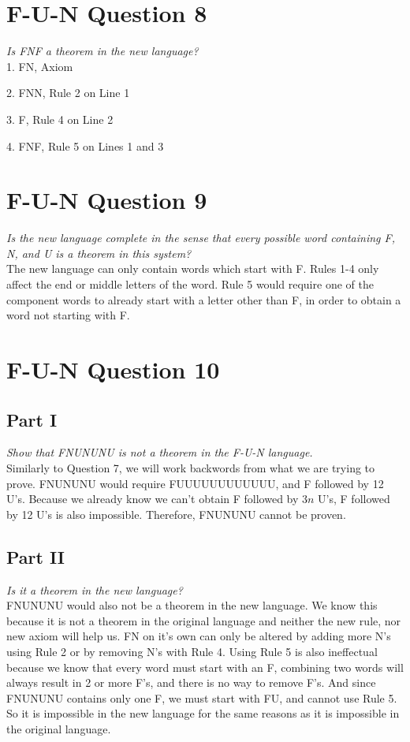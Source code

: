 \documentclass[12pt]{article}
\begin{document}
\newpage
\section{F-U-N Question 8}
\textit{Is FNF a theorem in the new language?}
\\

1. FN, Axiom

2. FNN, Rule 2 on Line 1

3. F, Rule 4 on Line 2

4. FNF, Rule 5 on Lines 1 and 3

\section{F-U-N Question 9}
\textit{Is the new language complete in the sense that every possible word containing F, N, and U is a theorem in this system?}
\\

The new language can only contain words which start with F. Rules 1-4 only affect the end or middle letters of the word. Rule 5 would require one of the component words to already start with a letter other than F, in order to obtain a word not starting with F.

\section{F-U-N Question 10}
\subsection{Part I}
\textit{Show that FNUNUNU is not a theorem in the F-U-N language.}
\\
Similarly to Question 7, we will work backwords from what we are trying to prove. FNUNUNU would require FUUUUUUUUUUUU, and F followed by 12 U’s. Because we already know we can’t obtain F followed by $3n$ U’s, F followed by 12 U’s is also impossible. Therefore, FNUNUNU cannot be proven.

\subsection{Part II}
\textit{Is it a theorem in the new language?}
\\
FNUNUNU would also not be a theorem in the new language. We know this because it is not a theorem in the original language and neither the new rule, nor new axiom will help us. FN on it’s own can only be altered by adding more N’s using Rule 2 or by removing N’s with Rule 4. Using Rule 5 is also ineffectual because we know that every word must start with an F, combining two words will always result in 2 or more F’s, and there is no way to remove F’s. And since FNUNUNU contains only one F, we must start with FU, and cannot use Rule 5. So it is impossible in the new language for the same reasons as it is impossible in the original language.
\end{document}
